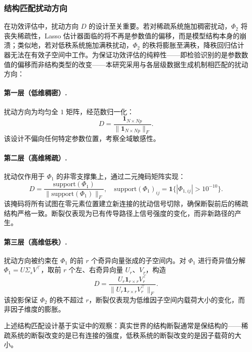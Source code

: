 \subsubsection{结构匹配扰动方向}\label{subsubsec:perturbation}

在功效评估中，扰动方向 $D$ 的设计至关重要。若对稀疏系统施加稠密扰动，$\Phi_2$ 将丧失稀疏性，Lasso 估计器面临的将不再是参数值的偏移，而是模型结构本身的崩溃；类似地，若对低秩系统施加满秩扰动，$\Phi_2$ 的秩将膨胀至满秩，降秩回归估计器无法在有效子空间中工作。为保证功效评估的纯粹性——即检验识别的是参数数值的偏移而非结构类型的改变——本研究采用与各层级数据生成机制相匹配的扰动方向：

\paragraph{第一层（低维稠密）.}
扰动方向为均匀全 $1$ 矩阵，经范数归一化：
\begin{equation}
    D = \frac{\mathbf{1}_{N \times Np}}{\|\mathbf{1}_{N \times Np}\|_F}.
\end{equation}
该设计不偏向任何特定参数位置，考察全域敏感性。

\paragraph{第二层（高维稀疏）.}
扰动仅作用于 $\Phi_1$ 的非零支撑集上，通过二元掩码矩阵实现：
\begin{equation}
    D = \frac{\mathrm{support}(\Phi_1)}{\|\mathrm{support}(\Phi_1)\|_F}, \quad \mathrm{support}(\Phi_1)_{ij} = \mathbf{1}\{|\Phi_{1,ij}| > 10^{-10}\}.
\end{equation}
该掩码将所有试图在零元素位置建立新连接的扰动信号切除，确保断裂前后的稀疏结构严格一致。断裂仅表现为已有传导路径上信号强度的变化，而非新路径的产生。

\paragraph{第三层（高维低秩）.}
扰动方向被约束在 $\Phi_1$ 的前 $r$ 个奇异向量张成的子空间内。对 $\Phi_1$ 进行奇异值分解 $\Phi_1 = U \Sigma_s V^\top$，取前 $r$ 个左、右奇异向量 $U_r$、$V_r$，构造
\begin{equation}
    D = \frac{U_r \mathbf{1}_{r \times r} V_r^\top}{\|U_r \mathbf{1}_{r \times r} V_r^\top\|_F}.
\end{equation}
该投影保证 $\Phi_2$ 的秩不超过 $r$，断裂仅表现为低维因子空间内载荷大小的变化，而非因子维度的膨胀。

上述结构匹配设计基于实证中的观察：真实世界的结构断裂通常是保结构的——稀疏系统的断裂改变的是已有连接的强度，低秩系统的断裂改变的是因子载荷的大小。

